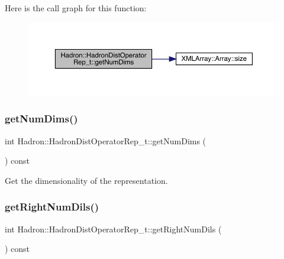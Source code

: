 Here is the call graph for this function\+:
\nopagebreak
\begin{figure}[H]
\begin{center}
\leavevmode
\includegraphics[width=350pt]{dd/de0/classHadron_1_1HadronDistOperatorRep__t_a19ee3c70f7ac127fbc534b0f69304b37_cgraph}
\end{center}
\end{figure}
\mbox{\label{classHadron_1_1HadronDistOperatorRep__t_a19ee3c70f7ac127fbc534b0f69304b37}} 
\subsubsection{\texorpdfstring{getNumDims()}{getNumDims()}\hspace{0.1cm}{\footnotesize\ttfamily [2/2]}}
{\footnotesize\ttfamily int Hadron\+::\+Hadron\+Dist\+Operator\+Rep\+\_\+t\+::get\+Num\+Dims (\begin{DoxyParamCaption}{ }\end{DoxyParamCaption}) const}



Get the dimensionality of the representation. 

\mbox{\label{classHadron_1_1HadronDistOperatorRep__t_ae7f1a0e6b68e409027be775990dd2970}} 
\subsubsection{\texorpdfstring{getRightNumDils()}{getRightNumDils()}\hspace{0.1cm}{\footnotesize\ttfamily [1/2]}}
{\footnotesize\ttfamily int Hadron\+::\+Hadron\+Dist\+Operator\+Rep\+\_\+t\+::get\+Right\+Num\+Dils (\begin{DoxyParamCaption}{ }\end{DoxyParamCaption}) const}

